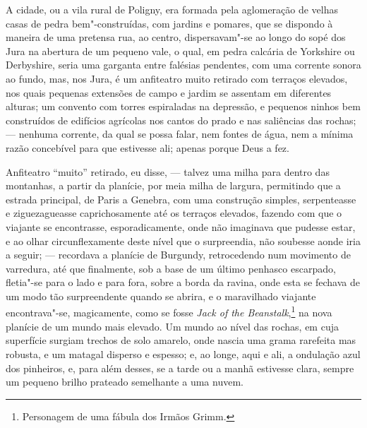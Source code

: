 A cidade, ou a vila rural de Poligny, era formada pela aglomeração
de velhas casas de pedra bem"-construídas, com jardins e pomares, que se
dispondo à maneira de uma pretensa rua, ao centro, dispersavam"-se ao
longo do sopé dos Jura na abertura de um pequeno vale, o qual, em pedra
calcária de Yorkshire ou Derbyshire, seria uma garganta entre falésias
pendentes, com uma corrente sonora ao fundo, mas, nos Jura, é um
anfiteatro muito retirado com terraços elevados, nos quais pequenas
extensões de campo e jardim se assentam em diferentes alturas; um
convento com torres espiraladas na depressão, e pequenos ninhos bem
construídos de edifícios agrícolas nos cantos do prado e nas saliências
das rochas; --- nenhuma corrente, da qual se possa falar, nem fontes de
água, nem a mínima razão concebível para que estivesse ali; apenas
porque Deus a fez.

Anfiteatro ``muito'' retirado, eu disse, --- talvez uma milha para dentro
das montanhas, a partir da planície, por meia milha de largura,
permitindo que a estrada principal, de Paris a Genebra, com uma
construção simples, serpenteasse e ziguezagueasse caprichosamente até os
terraços elevados, fazendo com que o viajante se encontrasse,
esporadicamente, onde não imaginava que pudesse estar, e ao olhar
circunflexamente deste nível que o surpreendia, não soubesse aonde iria
a seguir; --- recordava a planície de Burgundy, retrocedendo num
movimento de varredura, até que finalmente, sob a base de um último
penhasco escarpado, fletia"-se para o lado e para fora, sobre a borda da
ravina, onde esta se fechava de um modo tão surpreendente quando se
abrira, e o maravilhado viajante encontrava"-se, magicamente, como se
fosse \textit{Jack of the Beanstalk},\footnote{Personagem de uma fábula dos
  Irmãos Grimm.} na nova planície de um mundo mais
elevado. Um mundo ao nível das rochas, em cuja superfície surgiam
trechos de solo amarelo, onde nascia uma grama rarefeita mas robusta, e
um matagal disperso e espesso; e, ao longe, aqui e ali, a ondulação azul
dos pinheiros, e, para além desses, se a tarde ou a manhã estivesse
clara, sempre um pequeno brilho prateado semelhante a uma nuvem.

